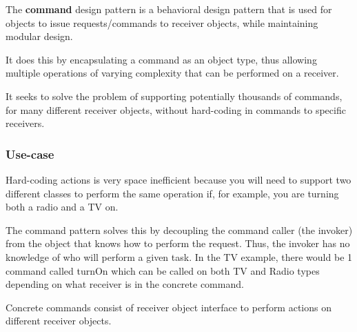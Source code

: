 \begin{summary}
    The {\bf command} design pattern is a behavioral design pattern that is
    used for objects to issue requests/commands to receiver objects, while
    maintaining modular design. 
    
    It does this by encapsulating a command as an object type, thus allowing
    multiple operations of varying complexity that can be performed on a
    receiver. 

    It seeks to solve the problem of supporting potentially thousands of
    commands, for many different receiver objects, without hard-coding in
    commands to specific receivers. 
\end{summary}

\subsubsection{Use-case}

Hard-coding actions is very space inefficient because you will need to support
two different classes to perform the same operation if, for example, you are
turning both a radio and a TV on. 

The command pattern solves this by decoupling the command caller (the invoker)
from the object that knows how to perform the request. Thus, the invoker has no
knowledge of who will perform a given task. In the TV example, there would be 1
command called {\sc turnOn} which can be called on both TV and Radio types
depending on what receiver is in the concrete command.

Concrete commands consist of receiver object interface to perform actions
on different receiver objects.

